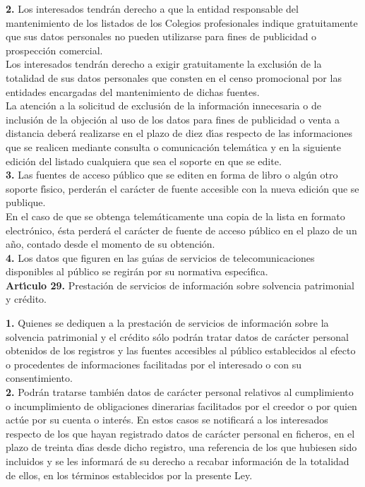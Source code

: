 {\bf 2.} Los interesados tendr\'an derecho a que la entidad responsable del 
mantenimiento de los listados de los Colegios profesionales indique 
gratuitamente que sus datos personales no pueden utilizarse para fines de 
publicidad o prospecci\'on comercial.\\
Los interesados tendr\'an derecho a exigir gratuitamente la exclusi\'on de la 
totalidad de sus datos personales que consten en el censo promocional por las 
entidades encargadas del mantenimiento de dichas fuentes.\\
La atenci\'on a la solicitud de exclusi\'on de la informaci\'on innecesaria o 
de inclusi\'on de la objeci\'on al uso de los datos para fines de publicidad o 
venta a distancia deber\'a realizarse en el plazo de diez d\'{\i}as respecto de 
las informaciones que se realicen mediante consulta o comunicaci\'on 
telem\'atica y en la siguiente edici\'on del listado cualquiera que sea el 
soporte en que se edite.\\

{\bf 3.} Las fuentes de acceso p\'ublico que se editen en forma de libro o 
alg\'un otro soporte f\'{\i}sico, perder\'an el car\'acter de fuente accesible 
con la nueva edici\'on que se publique.\\
En el caso de que se obtenga telem\'aticamente una copia de la lista en formato 
electr\'onico, \'esta perder\'a el car\'acter de fuente de acceso p\'ublico en 
el plazo de un a\~no, contado desde el momento de su obtenci\'on.\\

{\bf 4.} Los datos que figuren en las gu\'{\i}as de servicios de 
telecomunicaciones disponibles al p\'ublico se regir\'an por su normativa 
espec\'{\i}fica.
\vspace{0.3cm}\\
{\large {\bf Art\'{\i}culo 29.} Prestaci\'on de servicios de informaci\'on 
sobre solvencia patrimonial y cr\'edito.}

{\bf 1.} Quienes se dediquen a la prestaci\'on de servicios de informaci\'on 
sobre la solvencia patrimonial y el cr\'edito s\'olo podr\'an tratar datos de 
car\'acter personal obtenidos de los registros y las fuentes accesibles al 
p\'ublico establecidos al efecto o procedentes de informaciones facilitadas por 
el interesado o con su consentimiento.\\

{\bf 2.} Podr\'an tratarse tambi\'en datos de car\'acter personal relativos al 
cumplimiento o incumplimiento de obligaciones dinerarias facilitados por el 
creedor o por quien act\'ue por su cuenta o inter\'es. En estos casos se 
notificar\'a a los interesados respecto de los que hayan registrado datos de 
car\'acter personal en ficheros, en el plazo de treinta d\'{\i}as desde dicho 
registro, una referencia de los que hubiesen sido incluidos y se les 
informar\'a de su derecho a recabar informaci\'on de la totalidad de ellos, en 
los t\'erminos establecidos por la presente Ley.\\

